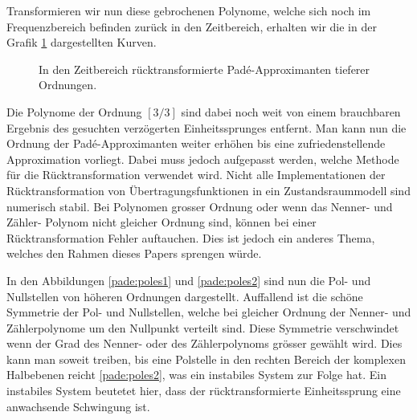Transformieren wir nun diese gebrochenen Polynome, welche sich noch
im Frequenzbereich befinden zurück in den Zeitbereich, erhalten wir
die in der Grafik \ref{pade:totzeitexp2} dargestellten Kurven.
\begin{figure}
\centering
{}
\caption{In den Zeitbereich rücktransformierte Padé-Approximanten tieferer Ordnungen\label{pade:totzeitexp2}.}
\end{figure}
Die Polynome der Ordnung $[3/3]$ sind dabei noch weit von einem brauchbaren Ergebnis des gesuchten verzögerten Einheitssprunges entfernt.
Man kann nun die Ordnung der Padé-Approximanten weiter erhöhen bis eine zufriedenstellende Approximation vorliegt.
Dabei muss jedoch aufgepasst werden, welche Methode für die
Rücktransformation verwendet wird.
Nicht alle Implementationen der Rücktransformation von Übertragungsfunktionen in ein Zustandsraummodell sind numerisch stabil. 
Bei Polynomen grosser Ordnung oder wenn das Nenner- und Zähler- Polynom nicht gleicher Ordnung sind, können bei einer Rücktransformation Fehler auftauchen.
Dies ist jedoch ein anderes Thema, welches den Rahmen dieses Papers sprengen würde.

In den Abbildungen \ref{pade:poles1} und \ref{pade:poles2}
sind nun die Pol- und Nullstellen von höheren Ordnungen dargestellt. 
Auffallend ist die schöne Symmetrie der Pol- und Nullstellen, welche
bei gleicher Ordnung der Nenner- und Zählerpolynome um den Nullpunkt
verteilt sind.
Diese Symmetrie verschwindet wenn der Grad des Nenner- oder des
Zählerpolynoms grösser gewählt wird.
Dies kann man soweit treiben, bis eine Polstelle in den rechten
Bereich der komplexen Halbebenen reicht \ref{pade:poles2},
was ein instabiles System zur Folge hat.
Ein instabiles System beutetet hier, dass der rücktransformierte
Einheitssprung eine anwachsende Schwingung ist.

